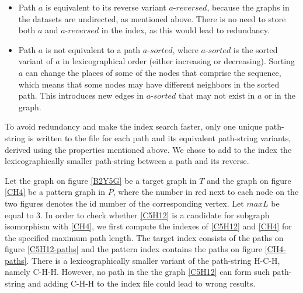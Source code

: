 \documentclass{l4proj}
\newcounter{example}[section]
\begin{document}
\begin{itemize}
\item Path $a$ is equivalent to its reverse variant $a$-$reversed$, because the graphs in the datasets are undirected, as mentioned above. There is no need to store both $a$ and $a$-$reversed$ in the index, as this would lead to redundancy.
\item Path $a$ is not equivalent to a path $a$-$sorted$, where $a$-$sorted$ is the sorted variant of $a$ in lexicographical order (either increasing or decreasing). Sorting $a$ can change the places of some of the nodes that comprise the sequence, which means that some nodes may have different neighbors in the sorted path. This introduces new edges in $a$-$sorted$ that may not exist in $a$ or in the graph.
\end{itemize}
To avoid redundancy and make the index search faster, only one unique path-string is written to the file for each path and its equivalent path-string variants, derived using the properties mentioned above. We chose to add to the index the lexicographically smaller path-string between a path and its reverse. \par
Let the graph on figure \ref{B2Y5G} be a target graph in $T$ and the graph on figure \ref{CH4} be a pattern graph in $P$, where the number in red next to each node on the two figures denotes the id number of the corresponding vertex. Let $maxL$ be equal to 3. In order to check whether \ref{C5H12} is a candidate for subgraph isomorphism with \ref{CH4}, we first compute the indexes of \ref{C5H12} and \ref{CH4} for the specified maximum path length. The target index consists of the paths on figure \ref{C5H12-paths} and the pattern index contains the paths on figure \ref{CH4-paths}. There is a lexicographically smaller variant of the path-string \textrm{H-C-H}, namely \textrm{C-H-H}. However, no path in the the graph \ref{C5H12} can form such path-string and adding \textrm{C-H-H} to the index file could lead to wrong results.\par
\end{document}
